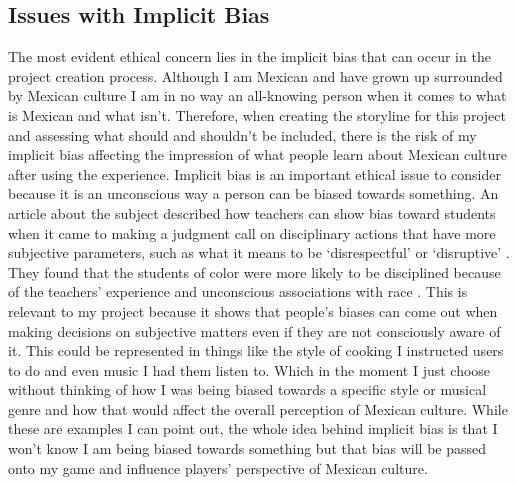 \documentclass[10pt,twocolumn]{article}
\begin{document}
\subsection{Issues with Implicit Bias}
The most evident ethical concern lies in the implicit bias that can occur in the project creation process. Although I am Mexican and have grown up surrounded by Mexican culture I am in no way an all-knowing person when it comes to what is Mexican and what isn’t. Therefore, when creating the storyline for this project and assessing what should and shouldn’t be included, there is the risk of my implicit bias affecting the impression of what people learn about Mexican culture after using the experience. Implicit bias is an important ethical issue to consider because it is an unconscious way a person can be biased towards something. An article about the subject described how teachers can show bias toward students when it came to making a judgment call on disciplinary actions that have more subjective parameters, such as what it means to be ‘disrespectful’ or ‘disruptive’ \cite{implicitbias201516}. They found that the students of color were more likely to be disciplined because of the teachers’ experience and unconscious associations with race \cite{implicitbias201516}. This is relevant to my project because it shows that people's biases can come out when making decisions on subjective matters even if they are not consciously aware of it. This could be represented in things like the style of cooking I instructed users to do and even music I had them listen to. Which in the moment I just choose without thinking of how I was being biased towards a specific style or musical genre and how that would affect the overall perception of Mexican culture. While these are examples I can point out, the whole idea behind implicit bias is that I won't know I am being biased towards something but that bias will be passed onto my game and influence players' perspective of Mexican culture. 
\end{document}
